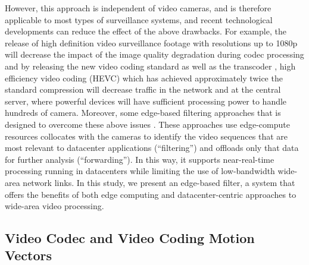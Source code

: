 However, this approach is independent of video cameras, and is therefore applicable to most types of surveillance systems, and recent technological developments can reduce the effect of the above drawbacks. For example, the release of high definition video surveillance footage with resolutions up to 1080p will decrease the impact of the image quality degradation during codec processing and by releasing the new video coding standard as well as the transcoder \cite{thanh2019efficient}, high efficiency video coding (HEVC)\cite{sullivan2012overview} which has achieved approximately twice the standard compression\cite{ohm2012comparison} will decrease traffic in the network and at the central server, where powerful devices will have sufficient processing power to handle hundreds of camera. Moreover, some edge-based filtering approaches that
is designed to overcome these above issues \cite{canel2019scaling}\cite{li2020reducto}\cite{chen2015glimpse}. These approaches use edge-compute resources collocates with the cameras to identify the video sequences that are most relevant to datacenter applications (“filtering”) and offloads only that data for further analysis (“forwarding”). In this way, it supports near-real-time processing running in datacenters while limiting the use of low-bandwidth wide-area network links. In this study, we present an edge-based filter, a system that offers the benefits of both edge computing and datacenter-centric approaches to wide-area video processing.
\subsection{Video Codec and Video Coding Motion Vectors}

